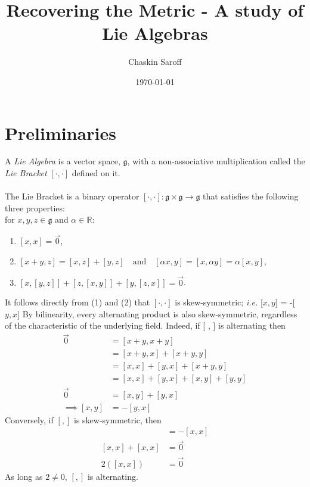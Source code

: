 \documentclass[11 pt]{article}
\title{Recovering the Metric - A study of Lie Algebras}
\author{Chaskin Saroff}
\date{\today} \draft
\renewcommand{\a}{\alpha}
\newcommand{\fg}{\mathfrak{g}}
\newcommand{\RR}{\mathbb{R}}
\begin{document}
\maketitle


\section{Preliminaries}

\begin{definition}

    A \emph{Lie Algebra} is a vector space, $\fg$, with a non-associative
    multiplication called the \emph{Lie Bracket} $[\cdot,\cdot]$ defined on it.
\\
\\The Lie Bracket is a binary operator $ [\cdot,\cdot]: \fg \times \fg \to \fg$
that satisfies the following three properties:
\\for $x,y,z \in \fg$ and $\a \in \RR$:
\begin{enumerate}
    \item  $[x,x]=\Vec{0}$,

    \item  $[x+y,z] = [x,z]+[y,z]\quad
        \text{and} \quad [\a x,y]=[x, \a y]=\a[x, y]$,

    \item  $[x,[y,z]] + [z,[x,y]] + [y,[z,x]] = \Vec{0}$.
\end{enumerate}
\end{definition}
It follows directly from (1) and (2) that $[\cdot,\cdot]$ is skew-symmetric;
\emph{i.e.} [$x,y$] = -[$y,x$] By bilinearity, every alternating product is
also skew-symmetric, regardless of the characteristic of the underlying field.
Indeed, if [ , ] is alternating then
    \begin{align}
        \Vec{0} &= [x + y, x + y]
        \\&= [x + y, x] + [x + y, y]
        \\&= [x,x] + [y, x] + [x + y, y]
        \\&= [x,x] + [y, x] + [x, y] + [y, y]
        \\\Vec{0}&=         [x, y] + [y, x]
        \\\implies [x,y] &= -[y,x]
    \end{align}
    Conversely, if $[,]$ is skew-symmetric, then
    \begin{align}
        [x,x] &= -[x,x]
        \\ [x,x]+[x,x]&=\Vec{0}
        \\ 2([x,x])&=\Vec{0}
    \end{align}
    As long as $2 \neq 0$, $[,]$ is alternating.
\end{document}
